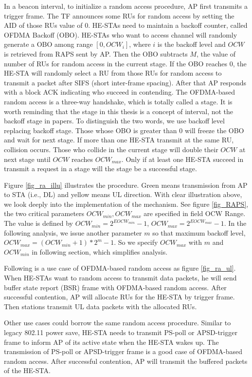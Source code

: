 In a beacon interval, to initialize a random access procedure, AP first transmits a trigger frame. 
The TF announces some RUs for random access by setting the AID of those RUs value of 0. 
HE-STAs need to maintain a backoff counter, called OFDMA Backoff (OBO). 
HE-STAs who want to access channel will randomly generate a OBO among range $[0, OCW_i]$, where $i$ is the backoff level and $OCW$ is retrieved from RAPS sent by AP. 
Then the OBO subtracts $M$, the value of number of RUs for random access in the current stage. 
If the OBO reaches 0, the HE-STA will randomly select a RU from those RUs for random access to transmit a packet after SIFS (short inter-frame spacing). 
After that AP responds with a block ACK indicating who succeed in contending.
The OFDMA-based random access is a three-way handshake, which is totally called a stage. 
It is worth reminding that the stage in this thesis is a concept of interval\cite{draft_ax}, not the backoff stage in papers\cite{bianchi2000performance}. 
To distinguish the two words, we use backoff level replacing backoff stage. 
Those whose OBO is greater than 0 will freeze the OBO and wait for next stage.  
If more than one HE-STA transmit at the same RU, collision occurs. 
Those who collide in the current stage will double their $OCW$ at next stage until $OCW$ reaches $OCW_{max}$. 
Only if at least one HE-STA succeed in transmit a request in a stage will the stage be a successful stage. 

Figure \ref{fig_ra_illu} illustrates the procedure. Green means transmission from AP to STA (i.e., DL) and yellow means UL direction. 
With clear illustration above, we look deeply into the implementation of the mechanism.
See figure \ref{fig_RAPS}, the two critical parameters $OCW_{min},OCW_{max}$ are specified in field OCW Range. 
The value is defined by $OCW_{min} = 2^{EOCW_{min}}-1$, $OCW_{max} = 2^{EOCW_{max}}-1$. 
In the following analysis, we issue another parameter $m$ so that maximum backoff level, $OCW_{max} = (OCW_{min}+1)*2^m-1$. So we specify $OCW_{max}$ with $m$ and $OCW_{min}$ in following section, which simplifies analysis.


Following is a use case of OFDMA-based random access as figure \ref{fig_ra_ul}. 
When HE-STAs want to random access to transmit data packets, he will send buffer state report (BSR) frame with OFDMA-based random access. 
After successful contention, AP will allocate RUs for the HE-STA by trigger frame.
Then stations transmit UL data packets with the allocated RUs. 


Other use cases could borrow the same random access procedure. 
Similar to legacy 802.11 power save, HE-STA needs to transmit PS-poll or APSD-trigger frame to inform AP of its active state when the HE-STA wakes up.
The transmission of PS-poll or APSD-trigger frame is a good case of OFDMA-based random access. After successful contention, AP will transmit the buffered packets of the HE-STA.

